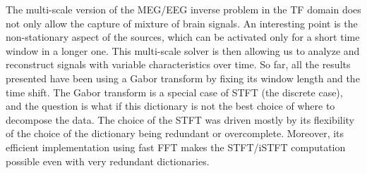 The multi-scale version of the MEG/EEG inverse problem in the TF domain does not only allow the capture of mixture of brain signals. An interesting point is the non-stationary aspect of the sources, which can be activated only for a short time window in a longer one. This multi-scale solver is then allowing us to analyze and reconstruct signals with variable characteristics over time. So far, all the results presented have been using a Gabor transform by fixing its window length and the time shift. The Gabor transform is a special case of STFT (the discrete case), and the question is what if this dictionary is not the best choice of where to decompose the data. The choice of the STFT was driven mostly by its flexibility of the choice of the dictionary being redundant or overcomplete. Moreover, its efficient implementation using fast FFT makes the STFT/iSTFT computation possible even with very redundant dictionaries.\\


